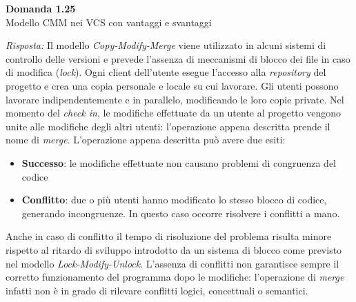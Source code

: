 \documentclass{article}
\newenvironment{problem}[2][Domanda]
    { \begin{mdframed}[backgroundcolor=gray!20] \textbf{#1 #2} \\}
    {  \end{mdframed}}
\newenvironment{solution}
    {\textit{Risposta:}}
    {}
\begin{document}
\begin{problem}{1.25}
Modello CMM nei VCS con vantaggi e svantaggi
\end{problem}
\begin{solution}
Il modello \textit{Copy-Modify-Merge} viene utilizzato in alcuni sistemi di controllo delle versioni e prevede l'assenza di meccanismi di blocco dei file in caso di modifica (\textit{lock}).
Ogni client dell'utente esegue l'accesso alla \textit{repository} del progetto e crea una copia personale e locale su cui lavorare. Gli utenti possono lavorare indipendentemente e in parallelo, modificando le loro copie private.
Nel momento del \textit{check in}, le modifiche effettuate da un utente al progetto vengono unite alle modifiche degli altri utenti: l'operazione appena descritta prende il nome di \textit{merge}.
L'operazione appena descritta può avere due esiti:
\begin{itemize}
	\item \textbf{Successo}: le modifiche effettuate non causano problemi di congruenza del codice
	\item \textbf{Conflitto}: due o più utenti hanno modificato lo stesso blocco di codice, generando incongruenze.
	\newline
	In questo caso occorre risolvere i conflitti a mano.
\end{itemize}
Anche in caso di conflitto il tempo di risoluzione del problema risulta minore rispetto al ritardo di sviluppo introdotto da un sistema di blocco come previsto nel modello \textit{Lock-Modify-Unlock}.
L'assenza di conflitti non garantisce sempre il corretto funzionamento del programma dopo le modifiche: l'operazione di \textit{merge} infatti non è in grado di rilevare conflitti logici, concettuali o semantici.
\end{solution}
\newpage
\end{document}
